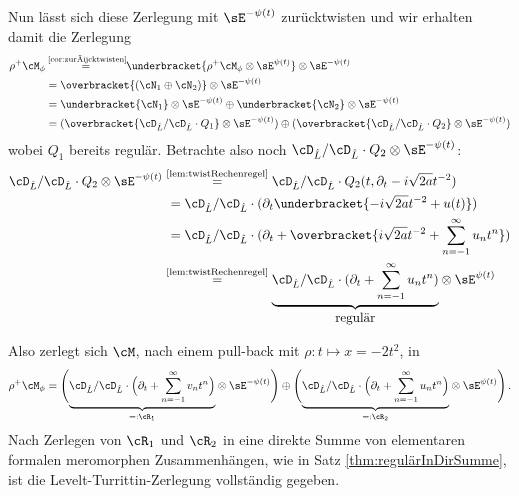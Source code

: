 Nun lässt sich diese Zerlegung mit $\sE^{-\psi(t)}$ zurücktwisten und wir
erhalten damit die Zerlegung
\begin{align*}
\rho^+\cM_{\phi} &\!\!\overset{\text{ \ref{cor:zurücktwisten}}}{=}\!\!
  \underbracket{\rho^+\cM_{\phi}\otimes\sE^{\psi(t)}} \otimes\sE^{-\psi(t)}
\\&= \overbracket{(\cN_1\oplus\cN_2)}\otimes\sE^{-\psi(t)}
\\&= \underbracket{\cN_1}\otimes\sE^{-\psi(t)}
  \oplus\underbracket{\cN_2}\otimes\sE^{-\psi(t)}
\\&= (\overbracket{\cD_{\hat L}/\cD_{\hat L}\cdot Q_1}\otimes\sE^{-\psi(t)})
  \oplus(\overbracket{\cD_{\hat L}/\cD_{\hat L}\cdot Q_2}\otimes\sE^{-\psi(t)})
\end{align*}
wobei $Q_1$ bereits regulär. Betrachte also noch $\cD_{\hat L}/\cD_{\hat
L}\cdot Q_2\otimes\sE^{-\psi(t)}$:
\begin{align*}
\cD_{\hat L}/\cD_{\hat L}\cdot Q_2\otimes\sE^{-\psi(t)}
  ~&\!\!\overset{\text{\ref{lem:twistRechenregel}}}{=}
  \cD_{\hat L}/\cD_{\hat L}\cdot Q_2(t,\partial_t-i\sqrt{2a}t^{-2})
\\&= \cD_{\hat L}/\cD_{\hat L}\cdot (\partial_t
  \underbracket{-i\sqrt{2a}t^{-2} + u(t)})
\\&= \cD_{\hat L}/\cD_{\hat L}\cdot (\partial_t + \overbracket{i\sqrt{2a}t^{-2}
  +\sum_{n=-1}^\infty u_nt^n})
\\&\!\!\overset{\text{\ref{lem:twistRechenregel}}}{=} \underset{\mbox{regulär}}{\underbrace{
  \cD_{\hat L}/\cD_{\hat L}\cdot (\partial_t
  + \sum_{n=-1}^\infty u_nt^n)}}\otimes\sE^{\psi(t)}
\end{align*}
\begin{comment}
Damit ist der zweite Summand also auch ein elementarer meromorpher
Zusammenhang.
\end{comment}
Also zerlegt sich $\cM$, nach einem pull-back mit $\rho:t\mapsto x=-2t^2$, in
\[
\rho^+\cM_{\phi} = \Bigg(
  \underset{=:\cR_1}{\underbrace{\cD_{\hat L}/\cD_{\hat L}\cdot \Big(\partial_t
  + \sum_{n=-1}^\infty v_nt^n\Big)}}\otimes\sE^{-\psi(t)}\Bigg)
  \oplus \Bigg(
  \underset{=:\cR_2}{\underbrace{\cD_{\hat L}/\cD_{\hat L}\cdot \Big(\partial_t
  + \sum_{n=-1}^\infty u_nt^n\Big)}}\otimes\sE^{\psi(t)}\Bigg) \,.
\]
Nach Zerlegen von $\cR_1$ und $\cR_2$ in eine direkte Summe von elementaren
formalen meromorphen Zusammenhängen, wie in Satz \ref{thm:regulärInDirSumme},
ist die Levelt-Turrittin-Zerlegung vollständig gegeben.

